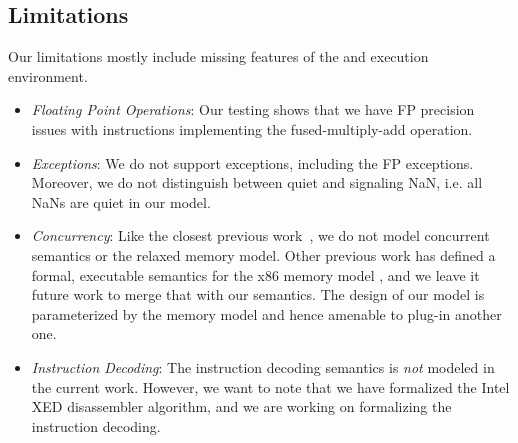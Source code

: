 \subsection{Limitations}\label{sec:limit}
Our limitations mostly include missing features of the \ISA and execution environment.
%
\begin{itemize}
 \item {\em Floating Point Operations\/}: Our testing shows that we have FP precision issues with instructions implementing the fused-multiply-add operation. 
 \item {\em Exceptions\/}: We do not support exceptions, including the FP exceptions. Moreover, we do not distinguish between quiet and signaling NaN, i.e. all NaNs are quiet in our model. 
 \item {\em Concurrency\/}: Like the closest previous work~\cite{Goel:FMCAD14,Heule2016a}, we do not model concurrent semantics or the relaxed memory model. Other previous work has defined a formal, executable semantics for the x86 memory model \cite{Sarkar:POPL09,Owens:x86-TSO}, and we leave it future work to merge that with our semantics. The design of our model  is parameterized by the memory model and hence amenable to plug-in another one.
 \item {\em Instruction Decoding\/}: The instruction decoding semantics is \emph{not} modeled in the current work. However, we want to note that we have formalized the Intel XED disassembler algorithm, and we are working on formalizing the instruction decoding.
\end{itemize}

